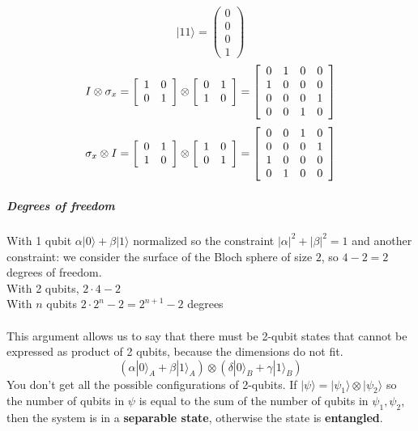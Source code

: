\documentclass[10pt]{report}
\begin{document}
$$|11\rangle = \left(\begin{array}{c}
0\\0\\0\\1
\end{array}\right)$$
$$I\otimes\sigma_x = \left[\begin{array}{c c}
1&0\\0&1
\end{array}\right]\otimes\left[\begin{array}{c c}
0&1\\1&0
\end{array}\right] = \left[\begin{array}{c c c c}
0&1&0&0\\
1&0&0&0\\
0&0&0&1\\
0&0&1&0
\end{array}\right]$$
$$\sigma_x\otimes I = \left[\begin{array}{c c}
0&1\\1&0
\end{array}\right]\otimes\left[\begin{array}{c c}
1&0\\0&1
\end{array}\right] = \left[\begin{array}{c c c c}
0&0&1&0\\
0&0&0&1\\
1&0&0&0\\
0&1&0&0
\end{array}\right]$$
\subparagraph{Degrees of freedom} With 1 qubit $\alpha|0\rangle+\beta|1\rangle$ normalized so the constraint $|\alpha|^2+|\beta|^2 = 1$ and another constraint: we consider the surface of the Bloch sphere of size $2$, so $4-2 = 2$ degrees of freedom.\\
With 2 qubits, $2\cdot4-2$\\
With $n$ qubits $2\cdot 2^n - 2 = 2^{n+1}-2$ degrees\\\\
This argument allows us to say that there must be 2-qubit states that cannot be expressed as product of 2 qubits, because the dimensions do not fit.
$$(\alpha|0\rangle_A+\beta|1\rangle_A)\otimes(\delta|0\rangle_B+\gamma|1\rangle_B)$$
You don't get all the possible configurations of 2-qubits. If $|\psi\rangle = |\psi_1\rangle\otimes|\psi_2\rangle$ so the number of qubits in $\psi$ is equal to the sum of the number of qubits in $\psi_1,\psi_2$, then the system is in a \textbf{separable state}, otherwise the state is \textbf{entangled}.\\
\end{document}
